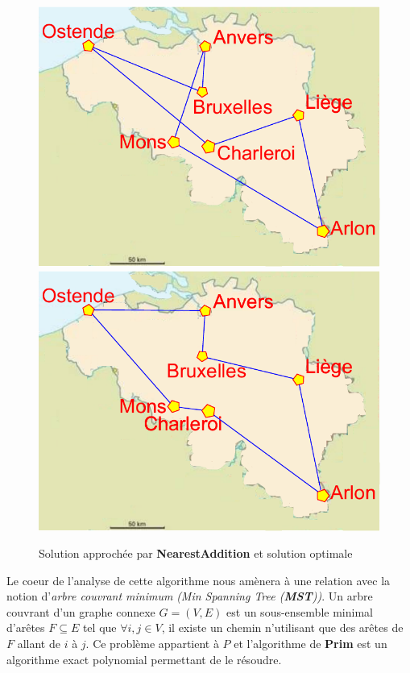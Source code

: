 \documentclass[12pt]{article}
\newcommand{\titre}[1]{\textcolor{title}{#1}}
\begin{document}
\begin{figure}[h!]
    \begin{center}
    \includegraphics[scale=0.5]{belgiqueNA.pdf}
    \includegraphics[scale=0.5]{belgiqueOPT.pdf}
    \caption{Solution approchée par \textbf{NearestAddition} et solution optimale}
    \end{center}
\end{figure}

Le coeur de l'analyse de cette algorithme nous amènera à une relation avec la notion d'\textit{arbre couvrant minimum} \textit{(Min
Spanning Tree (\textbf{\titre{MST}}))}. Un arbre couvrant d'un graphe connexe $G=(V,E)$ est un sous-ensemble minimal d'arêtes $F\subseteq
E$ tel que $\forall i,j \in V$, il existe un chemin n'utilisant que des arêtes de $F$ allant de $i$ à $j$. Ce problème appartient à $P$ et
l'algorithme de \textbf{Prim} est un algorithme exact polynomial permettant de le résoudre.
\end{document}
